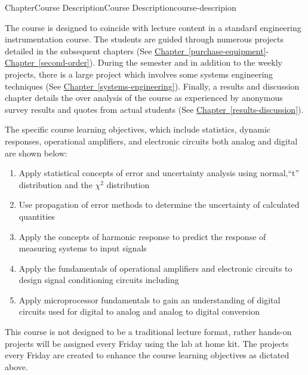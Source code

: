 \documentclass[oneside,10pt,]{book}
\newcommand{\xreffont}{\relax}
\newcommand{\linkhilite}[1]{\underline{#1}}
\numberwithin{equation}{section}
\begin{document}
%
%
\typeout{************************************************}
\typeout{************************************************}
%
\begin{chapterptx}{Chapter}{Course Description}{}{Course Description}{}{}{course-descripion}
\renewcommand*{\chaptername}{Chapter}
\begin{introduction}{}%
The course is designed to coincide with lecture content in a standard engineering instrumentation course. The students are guided through numerous projects detailed in the subsequent chapters (See \hyperref[purchase-equipment]{\linkhilite{Chapter~{\xreffont\ref{purchase-equipment}}}}-\hyperref[second-order]{\linkhilite{Chapter~{\xreffont\ref{second-order}}}}). During the semester and in addition to the weekly projects, there is a large project which involves some systems engineering techniques (See \hyperref[systems-engineering]{\linkhilite{Chapter~{\xreffont\ref{systems-engineering}}}}). Finally, a results and discussion chapter details the over analysis of the course as experienced by anonymous survey results and quotes from actual students (See \hyperref[results-discussion]{\linkhilite{Chapter~{\xreffont\ref{results-discussion}}}}).%
\par
The specific course learning objectives, which include statistics, dynamic responses, operational amplifiers, and electronic circuits both analog and digital are shown below:%
\begin{enumerate}
\item{}Apply statistical concepts of error and uncertainty analysis using normal,\textquotedblleft{}t\textquotedblright{} distribution and the \(\chi^2\) distribution%
\item{}Use propagation of error methods to determine the uncertainty of calculated quantities%
\item{}Apply the concepts of harmonic response to predict the response of measuring systems to input signals%
\item{}Apply the fundamentals of operational amplifiers and electronic circuits to design signal conditioning circuits including%
\item{}Apply microprocessor fundamentals to gain an understanding of digital circuits used for digital to analog and analog to digital conversion%
\end{enumerate}
%
\par
This course is not designed to be a traditional lecture format, rather hands-on projects will be assigned every Friday using the lab at home kit. The projects every Friday are created to enhance the course learning objectives as dictated above.%

\end{introduction}
\end{chapterptx}
\end{document}
